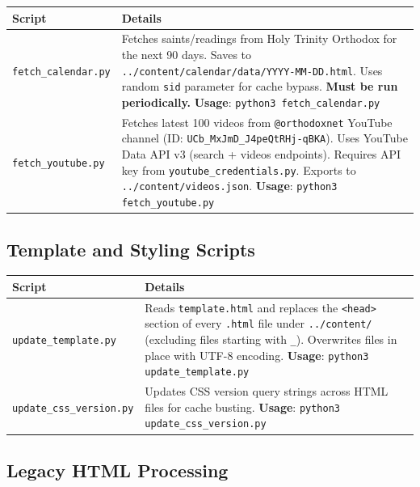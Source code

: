 \documentclass[12pt]{article}
\begin{document}
{\footnotesize
\begin{longtable}{p{4.5cm}p{8cm}}
\toprule
\textbf{Script} & \textbf{Details} \\
\midrule
\texttt{fetch\_calendar.py} &
    Fetches saints/readings from Holy Trinity Orthodox for the next 90 days.
    Saves to \texttt{../content/calendar/data/YYYY-MM-DD.html}.
    Uses random \texttt{sid} parameter for cache bypass.
    \textbf{Must be run periodically.}
    \newline\textbf{Usage}: \texttt{python3 fetch\_calendar.py} \\
\midrule
\texttt{fetch\_youtube.py} &
    Fetches latest 100 videos from \texttt{@orthodoxnet} YouTube channel
    (ID: \texttt{UCb\_MxJmD\_J4peQtRHj-qBKA}).
    Uses YouTube Data API v3 (search + videos endpoints).
    Requires API key from \texttt{youtube\_credentials.py}.
    Exports to \texttt{../content/videos.json}.
    \newline\textbf{Usage}: \texttt{python3 fetch\_youtube.py} \\
\bottomrule
\end{longtable}
}

\subsection{Template and Styling Scripts}

{\footnotesize
\begin{longtable}{p{4.5cm}p{8cm}}
\toprule
\textbf{Script} & \textbf{Details} \\
\midrule
\texttt{update\_template.py} &
    Reads \texttt{template.html} and replaces the \texttt{<head>} section of every
    \texttt{.html} file under \texttt{../content/} (excluding files starting with \texttt{\_}).
    Overwrites files in place with UTF-8 encoding.
    \newline\textbf{Usage}: \texttt{python3 update\_template.py} \\
\midrule
\texttt{update\_css\_version.py} &
    Updates CSS version query strings across HTML files for cache busting.
    \newline\textbf{Usage}: \texttt{python3 update\_css\_version.py} \\
\bottomrule
\end{longtable}
}

\subsection{Legacy HTML Processing}
\end{document}
